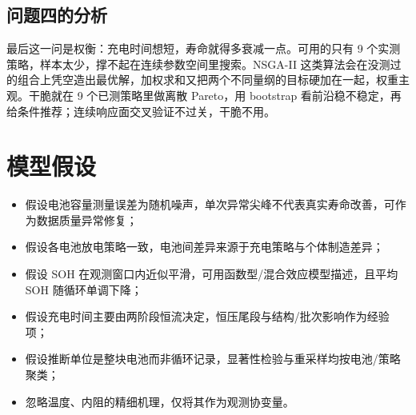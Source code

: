 \documentclass[withoutpreface,bwprint]{cumcmthesis}
\begin{document}
\subsection{问题四的分析}
最后这一问是权衡：充电时间想短，寿命就得多衰减一点。可用的只有 9 个实测策略，样本太少，撑不起在连续参数空间里搜索。NSGA-II 这类算法会在没测过的组合上凭空造出最优解，加权求和又把两个不同量纲的目标硬加在一起，权重主观。干脆就在 9 个已测策略里做离散 Pareto，用 bootstrap 看前沿稳不稳定，再给条件推荐；连续响应面交叉验证不过关，干脆不用。

\section{模型假设}
\begin{itemize}
\item [(1)] 假设电池容量测量误差为随机噪声，单次异常尖峰不代表真实寿命改善，可作为数据质量异常修复；
\item [(2)] 假设各电池放电策略一致，电池间差异来源于充电策略与个体制造差异；
\item [(3)] 假设 SOH 在观测窗口内近似平滑，可用函数型/混合效应模型描述，且平均 SOH 随循环单调下降；
\item [(4)] 假设充电时间主要由两阶段恒流决定，恒压尾段与结构/批次影响作为经验项；
\item [(5)] 假设推断单位是整块电池而非循环记录，显著性检验与重采样均按电池/策略聚类；
\item [(6)] 忽略温度、内阻的精细机理，仅将其作为观测协变量。
\end{itemize}

\end{document}
